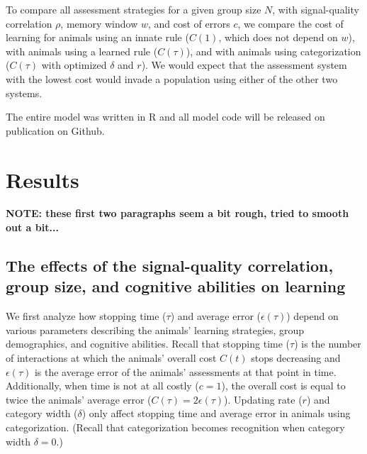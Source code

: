 To compare all assessment strategies for a given group size $N$, with signal-quality correlation $\rho$, memory window $w$, and cost of errors $c$, we compare the cost of learning for animals using an innate rule ($C(1)$, which does not depend on $w$), with animals using a learned rule ($C(\tau)$), and with animals using categorization ($C(\tau)$ with optimized $\delta$ and $r$). We would expect that the assessment system with the lowest cost would invade a population using either of the other two systems.


The entire model was written in R and all model code will be released on publication on Github.

\section*{Results}

\textbf{NOTE: these first two paragraphs seem a bit rough, tried to smooth out a bit...}

\subsection*{The effects of the signal-quality correlation, group size, and cognitive abilities on learning}
We first analyze how stopping time ($\tau$)  and average error ($\epsilon(\tau)$) depend on various parameters describing the animals' learning strategies, group demographics, and cognitive abilities. Recall that stopping time ($\tau$) is the number of interactions at which the animals' overall cost $C(t)$ stops decreasing and $\epsilon(\tau)$ is the average error of the animals' assessments at that point in time. Additionally, when time is not at all costly ($c=1$), the overall cost is equal to twice the animals' average error ($C(\tau)=2\epsilon(\tau)$). Updating rate ($r$) and category width ($\delta$) only affect stopping time and average error in animals using categorization. (Recall that categorization becomes recognition when category width $\delta=0$.) 

